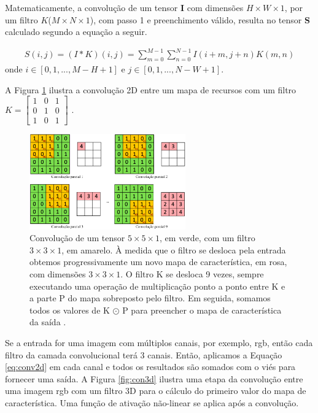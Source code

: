 Matematicamente, a convolução de um tensor \textbf{I} com dimensões $H \times W \times 1$, por um filtro $K$($M \times N \times 1$), com passo 1 e  preenchimento válido, resulta no tensor \textbf{S} calculado segundo a equação a seguir. 

\begin{equation}
\label{eq:conv2d}
\begin{aligned}
S(i,j) = (I*K)(i,j)=  \sum_{m=0}^{M-1}\sum_{n=0}^{N-1}I(i+m,j+n)K(m,n) 
\end{aligned}
\end{equation}
onde $i \in [0,1,..., M-H+1]$ e $j \in [0,1,..., N-W+1]$. 

A Figura \ref{fig:con2d} ilustra a convolução 2D entre um mapa de recursos com um filtro $K = \begin{bmatrix}
1 &  0& 1\\ 
0 &  1& 0\\ 
1 &  0& 1
\end{bmatrix}$ .


\begin{figure}[h]
	\centering
	\includegraphics[width=0.6\textwidth]{figuras/conv2D.pdf}
	\caption[Convolução 2D em um mapa de recurso.]{Convolução de um tensor $5 \times 5 \times 1$, em verde, com um filtro $3 \times 3 \times 1$, em amarelo. À medida que o filtro se desloca pela entrada obtemos progressivamente um novo mapa de característica, em rosa, com dimensões $3 \times 3 \times 1$.  O filtro K se desloca 9 vezes, sempre executando uma operação de multiplicação ponto a ponto entre K e a parte P do mapa sobreposto pelo filtro. Em seguida, somamos todos os valores de K $\odot$ P para preencher o mapa de característica da saída \cite{sumit}.}
	\label{fig:con2d}
\end{figure}

Se a entrada for uma imagem com múltiplos canais, por exemplo, \acrshort{rgb}, então cada filtro da camada convolucional terá 3 canais.  Então, aplicamos a Equação \ref{eq:conv2d} em cada canal e todos os resultados são somados com o viés para fornecer uma saída. A Figura \ref{fig:con3d} ilustra uma etapa da convolução entre uma imagem \acrshort{rgb} com um filtro 3D para o cálculo do primeiro valor do mapa de característica. Uma função de ativação não-linear se aplica após a convolução.

